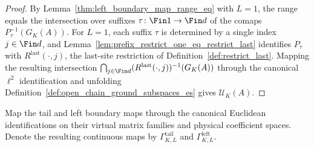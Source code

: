 \begin{proof}
    \leanok
    By Lemma~\ref{thm:left_boundary_map_range_eq} with $L=1$, the range equals
    the intersection over suffixes $\tau\colon\Fin 1\to\Fin d$ of the comaps
    $P_\tau^{-1}(G_K(A))$.  For $L=1$, each suffix $\tau$ is determined by a
    single index $j\in\Fin d$, and Lemma~\ref{lem:prefix_restrict_one_eq_restrict_last}
    identifies $P_\tau$ with $R^{\mathrm{last}}(\cdot,j)$, the last-site restriction of
    Definition~\ref{def:restrict_last}.  Mapping the
    resulting intersection $\bigcap_{j\in\Fin d}(R^{\mathrm{last}}(\cdot,j))^{-1}(G_K(A))$
    through the canonical $\ell^2$ identification and
    unfolding Definition~\ref{def:open_chain_ground_subspaces_es} gives
    $\mathcal U_K(A)$.
\end{proof}

\begin{definition}
    \label{def:spectator_boundary_maps_es}
    \leanok
    Map the tail and left boundary maps through the canonical Euclidean
    identifications on their virtual matrix families and physical coefficient
    spaces.  Denote the resulting continuous maps by
    $\Gamma^{\mathrm{tail}}_{K,L}$ and
    $\Gamma^{\mathrm{left}}_{K,L}$.
\end{definition}

